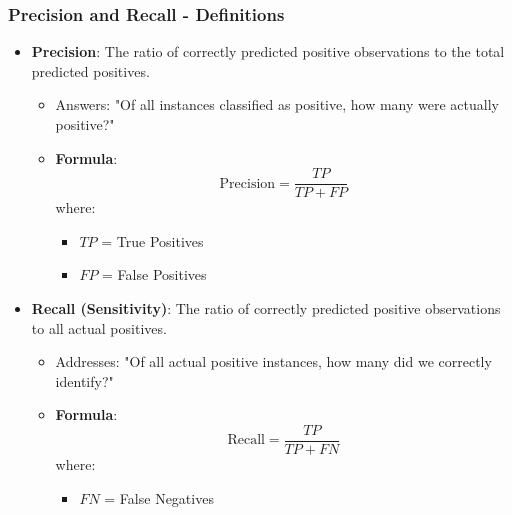 \documentclass[aspectratio=169]{beamer}
\begin{document}
\begin{frame}[fragile]
    \frametitle{Precision and Recall - Definitions}
    \begin{itemize}
        \item \textbf{Precision}: The ratio of correctly predicted positive observations to the total predicted positives.
        \begin{itemize}
            \item Answers: "Of all instances classified as positive, how many were actually positive?"
            \item \textbf{Formula}:
            \begin{equation}
            \text{Precision} = \frac{TP}{TP + FP}
            \end{equation}
            where:
            \begin{itemize}
                \item $TP$ = True Positives
                \item $FP$ = False Positives
            \end{itemize}
        \end{itemize}
        
        \item \textbf{Recall (Sensitivity)}: The ratio of correctly predicted positive observations to all actual positives.
        \begin{itemize}
            \item Addresses: "Of all actual positive instances, how many did we correctly identify?"
            \item \textbf{Formula}:
            \begin{equation}
            \text{Recall} = \frac{TP}{TP + FN}
            \end{equation}
            where:
            \begin{itemize}
                \item $FN$ = False Negatives
            \end{itemize}
        \end{itemize}
    \end{itemize}
\end{frame}
\end{document}
